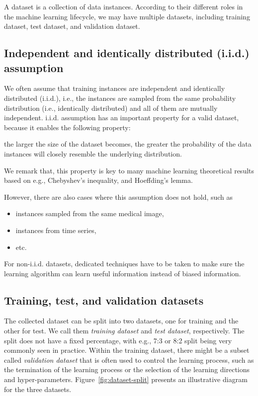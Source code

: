 A dataset is a collection of data instances. According to their different roles in the machine learning lifecycle, we may have multiple datasets, including training dataset, test dataset, and validation dataset. 

\subsection*{Independent and identically distributed (i.i.d.) assumption}

We often assume that training instances are independent and identically distributed (i.i.d.), i.e., the instances are sampled from the same probability distribution (i.e., identically distributed) and all of them are mutually independent.
i.i.d. assumption has an important property for a valid dataset, because it enables the following property: 
\begin{tcolorbox}
the larger the size of the dataset becomes, the greater the probability of the data instances will closely resemble the underlying distribution. 
\end{tcolorbox} 
We remark that, this property is key to many machine learning theoretical results
based on e.g., Chebyshev's inequality, and Hoeffding's lemma.  

However, there are also cases where this assumption does not hold, such as 
\begin{itemize}
    \item instances sampled from the same medical image,
    \item instances from time series,
    \item etc. 

\end{itemize}
For non-i.i.d. datasets, dedicated techniques have to be taken to make sure the learning algorithm can learn useful information instead of biased information.  

\subsection*{Training, test, and validation datasets}

The collected dataset can be split into two datasets, one for training and the other for test. We call them \emph{training dataset} and \emph{test dataset}, respectively.  The split does not have a fixed percentage, with e.g., 7:3 or 8:2 split being very commonly seen in practice.  Within the training dataset, there might be a subset called \emph{validation dataset} that is often used to control the learning process, such as the termination of the learning process or the selection of the learning directions and hyper-parameters. Figure~\ref{fig:dataset-split} presents an illustrative diagram for the three datasets. 


